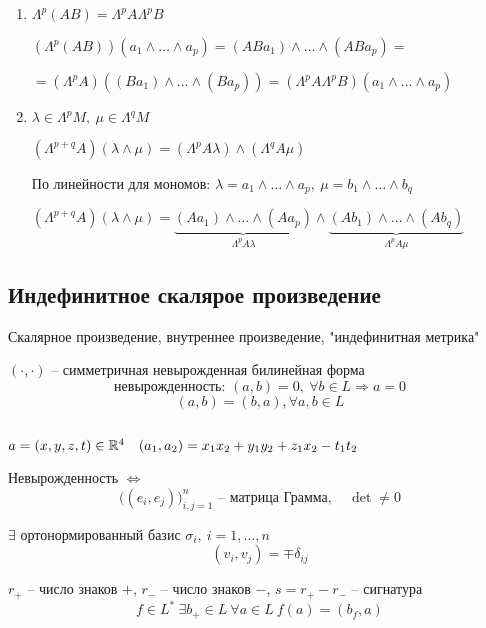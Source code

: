     \begin{enumerate}
        \item \par $\Lambda^p(AB) = \Lambda^p A \Lambda^p B$
            \par $(\Lambda^p(AB)) (a_1 \wedge \dots \wedge a_p) = (ABa_1) \wedge \dots \wedge (ABa_p) = $
            \par $= (\Lambda^p A)((Ba_1) \wedge \dots \wedge (Ba_p)) = (\Lambda^p A \Lambda^p B)(a_1 \wedge \dots \wedge a_p)$
        \item $\lambda \in \Lambda^p M, \ \mu \in \Lambda^q M$
            \par $(\Lambda^{p+q}A)(\lambda \wedge \mu) = (\Lambda^p A\lambda) \wedge (\Lambda^q A \mu)$
            \par По линейности для мономов: $\lambda = a_1 \wedge \dots \wedge a_p, \ \mu = b_1 \wedge \dots \wedge b_q$
            \par $(\Lambda^{p+q}A)(\lambda \wedge \mu) = \underbrace{(Aa_1) \wedge \dots \wedge (Aa_p)}_{\Lambda^p A\lambda} \wedge \underbrace{(Ab_1) \wedge \dots \wedge (Ab_q)}_{\Lambda^p A\mu}$
    \end{enumerate}

    \subsection*{Индефинитное скалярое произведение}

    \par Скалярное произведение, внутреннее произведение, "индефинитная метрика"
    \par $(\cdot, \cdot)$ -- симметричная невырожденная билинейная форма
    \[
        \text{невырожденность: } (a, b) = 0, \ \forall b \in L \Rightarrow a = 0    
    \]
    \[
        (a, b) = (b, a), \forall a, b \in L    
    \]

    \begin{illustration*}
        $ $
        \par $a = (x, y, z, t) \in \mathbb{R}^4 \quad (a_1, a_2) = x_1x_2 + y_1y_2 + z_1x_2 - t_1t_2$
    \end{illustration*}

    \par Невырожденность $\Leftrightarrow$ \[
        \bigg((e_i, e_j)\bigg)_{i, j = 1}^n \text{ -- матрица Грамма}, \quad \det \not= 0
    \]
    \par $\exists$ ортонормированный базис $\sigma_i, \ i = 1, \dots, n$
    \[
        (v_i, v_j) = \mp \delta_{ij}    
    \]
    \par $r_+$ -- число знаков $+$, $r_-$ -- число знаков $-$, $s = r_+ - r_-$ -- сигнатура %
    \[
        f \in L^* \ \exists b_+ \in L \ \forall a \in L \ f(a) = (b_f, a)
    \]

